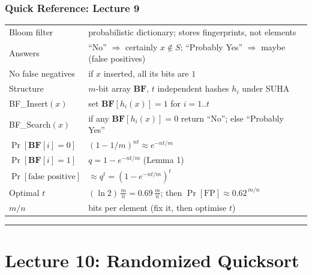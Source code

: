 \documentclass[11pt]{article}
\begin{document}
\section*{\textcolor{violetT}{Quick Reference: Lecture 9}}
\begin{keybox}
\renewcommand{\arraystretch}{1.4}
\begin{tabular}{l l}
Bloom filter & probabilistic dictionary; stores fingerprints, not elements\\
Answers & ``No'' $\Rightarrow$ \textcolor{greenO}{certainly} $x \notin S$; ``Probably Yes'' $\Rightarrow$ maybe (false positives)\\
No false negatives & if $x$ inserted, all its bits are $1$\\
Structure & $m$-bit array $\mathbf{BF}$, $t$ independent hashes $h_i$ under SUHA\\
BF\_Insert$(x)$ & set $\mathbf{BF}[h_i(x)] = 1$ for $i = 1..t$\\
BF\_Search$(x)$ & if any $\mathbf{BF}[h_i(x)] = 0$ return ``No''; else ``Probably Yes''\\
$\Pr[\mathbf{BF}[i]=0]$ & $(1 - 1/m)^{nt} \approx e^{-nt/m}$\\
$\Pr[\mathbf{BF}[i]=1]$ & $q = 1 - e^{-nt/m}$ \quad (Lemma 1)\\
$\Pr[\text{false positive}]$ & $\approx q^t = (1 - e^{-nt/m})^t$\\
Optimal $t$ & $(\ln 2)\,\tfrac{m}{n} = 0.69\,\tfrac{m}{n}$; then $\Pr[\text{FP}] \approx 0.62^{\,m/n}$\\
$m/n$ & bits per element (fix it, then optimise $t$)\\
\end{tabular}
\end{keybox}

\vspace{4pt}
\begin{center}\textcolor{greyline}{\rule{0.5\linewidth}{0.6pt}}\end{center}

\newpage


\part*{\textcolor{utnavy}{Lecture 10: Randomized Quicksort}}
\end{document}
